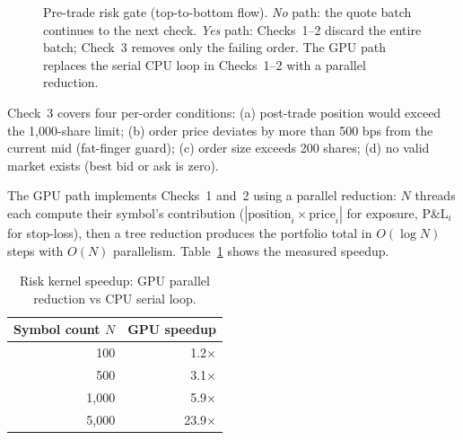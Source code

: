 \documentclass[12pt]{article}
\begin{document}
\begin{figure}[h]
\caption{Pre-trade risk gate (top-to-bottom flow).
  \textit{No} path: the quote batch continues to the next check.
  \textit{Yes} path: Checks~1--2 discard the entire batch;
  Check~3 removes only the failing order.
  The GPU path replaces the serial CPU loop in Checks~1--2 with a
  parallel reduction.}
\label{fig:risk_gate}
\end{figure}

Check~3 covers four per-order conditions: (a) post-trade position would
exceed the 1{,}000-share limit; (b) order price deviates by more than
500 bps from the current mid (fat-finger guard); (c) order size exceeds
200 shares; (d) no valid market exists (best bid or ask is zero).

The GPU path implements Checks~1 and~2 using a parallel reduction:
$N$ threads each compute their symbol's contribution
($|\text{position}_i \times \text{price}_i|$ for exposure,
$\text{P\&L}_i$ for stop-loss), then a tree reduction produces the
portfolio total in $O(\log N)$ steps with $O(N)$ parallelism.
Table~\ref{tab:risk_speedup} shows the measured speedup.

\begin{table}[h]
\centering
\caption{Risk kernel speedup: GPU parallel reduction vs CPU serial loop.}
\label{tab:risk_speedup}
\begin{tabular}{@{}rr@{}}
\toprule
\textbf{Symbol count $N$} & \textbf{GPU speedup} \\
\midrule
100   & 1.2$\times$ \\
500   & 3.1$\times$ \\
1{,}000 & 5.9$\times$ \\
5{,}000 & 23.9$\times$ \\
\bottomrule
\end{tabular}
\end{table}
\end{document}
